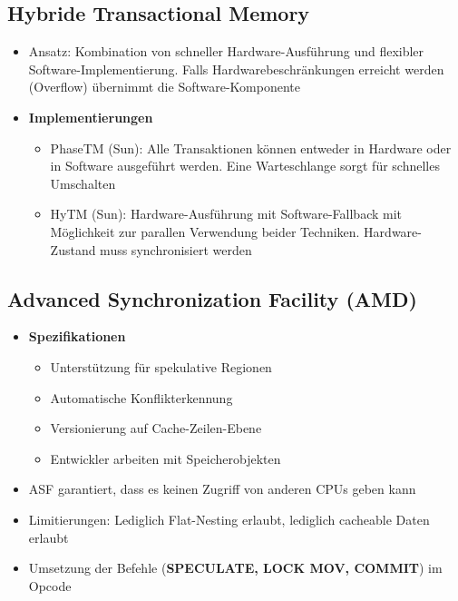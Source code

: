 \subsection{Hybride Transactional Memory}
\begin{itemize}
	\item Ansatz: Kombination von schneller Hardware-Ausführung und flexibler Software-Implementierung. Falls Hardwarebeschränkungen erreicht werden (Overflow) übernimmt die Software-Komponente
	\item \textbf{Implementierungen}
	\begin{itemize}
		\item PhaseTM (Sun): Alle Transaktionen können entweder in Hardware oder in Software ausgeführt werden. Eine Warteschlange sorgt für schnelles Umschalten
		\item HyTM (Sun): Hardware-Ausführung mit Software-Fallback mit Möglichkeit zur parallen Verwendung beider Techniken. Hardware-Zustand muss synchronisiert werden
	\end{itemize}
\end{itemize}


\subsection{Advanced Synchronization Facility (AMD)}
\begin{itemize}
	\item \textbf{Spezifikationen}
	\begin{itemize}
		\item Unterstützung für spekulative Regionen
		\item Automatische Konflikterkennung
		\item Versionierung auf Cache-Zeilen-Ebene
		\item Entwickler arbeiten mit Speicherobjekten
	\end{itemize}
	\item ASF garantiert, dass es keinen Zugriff von anderen CPUs geben kann
	\item Limitierungen: Lediglich Flat-Nesting erlaubt, lediglich cacheable Daten erlaubt %
	\item Umsetzung der Befehle (\textbf{SPECULATE, LOCK MOV, COMMIT}) im Opcode
\end{itemize}


